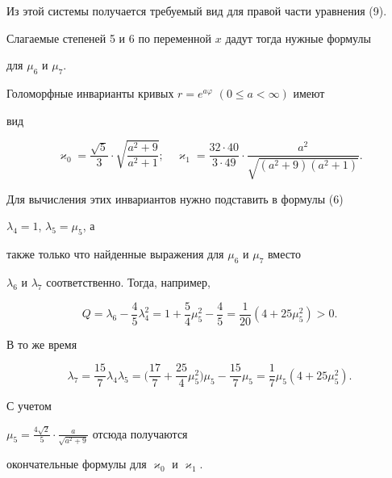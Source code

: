 Из этой системы получается требуемый вид для правой части уравнения (9). 


Слагаемые степеней 5 и 6 по переменной $x$ дадут тогда нужные формулы  


для $\mu_6$ и $\mu_7$. 


 


\begin{thmnonum} 


Голоморфные инварианты кривых $r=e^{a\varphi}$ $(0\le a<\infty)$ имеют 


вид 


$$ 


\varkappa_0=\frac{\sqrt 5}{3}\cdot\sqrt{\frac{a^2+9}{a^2+1}};\quad 


\varkappa_1=\frac{32\cdot 40}{3\cdot 49}\cdot 


\frac{a^2}{\sqrt{(a^2+9)(a^2+1)}}. 


$$ 


\end{thmnonum} 


 


Для вычисления этих инвариантов нужно подставить в формулы (6) 


$\lambda_4=1$, $\lambda_5=\mu_5$, а 


также только что найденные выражения для $\mu_6$ и $\mu_7$ вместо 


$\lambda_6$ и $\lambda_7$ соответственно. Тогда, например, 


$$ 


Q=\lambda_6-\frac{4}{5}\lambda^2_4=1+\frac{5}{4}\mu^2_5-\frac{4}{5}= 


\frac{1}{20}(4+25\mu^2_5)>0. 


$$ 


В то же время 


$$ 


\lambda_7=\frac{15}{7}\lambda_4\lambda_5=\biggl(\frac{17}{7} 


+\frac{25}{4}\mu^2_5\biggr)\mu_5-\frac{15}{7}\mu_5= 


\frac{1}{7}\mu_5(4+25\mu^2_5). 


$$ 


С учетом 


$\mu_5=\frac{4\sqrt 2}{5}\cdot\frac{a}{\sqrt{a^2+9}}$ отсюда получаются 


окончательные формулы для $\varkappa_0$ и $\varkappa_1$. 


 


